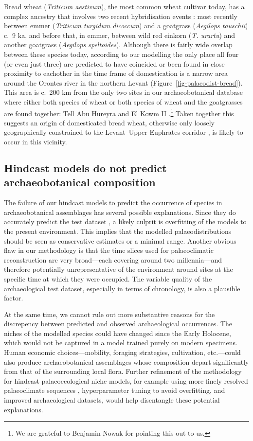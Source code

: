 \documentclass[
  authoryear,
  preprint]{elsarticle}
\begin{document}
Bread wheat (\emph{Triticum aestivum}), the most common wheat cultivar
today, has a complex ancestry that involves two recent hybridisation
events \citep{LevyFeldman2022}: most recently between emmer
(\emph{Triticum turgidum dicoccum}) and a goatgrass (\emph{Aegilops
tauschii}) c.~9 ka, and before that, in emmer, between wild red einkorn
(\emph{T. urartu}) and another goatgrass (\emph{Aegilops speltoides}).
Although there is fairly wide overlap between these species today,
according to our modelling the only place all four (or even just three)
are predicted to have coincided or been found in close proximity to
eachother in the time frame of domestication is a narrow area around the
Orontes river in the northern Levant
(Figure~\ref{fig-palaeodist-bread}). This area is c.~200 km from the
only two sites in our archaeobotanical database where either both
species of wheat or both species of wheat and the goatgrasses are found
together: Tell Abu Hureyra and El Kowm II
\citep{ArranzOtaeguiRoe2023}.\footnote{We are grateful to Benjamin Nowak
  for pointing this out to us.} Taken together this suggests an origin
of domesticated bread wheat, otherwise only loosely geographically
constrained to the Levant--Upper Euphrates corridor
\citep{LevyFeldman2022}, is likely to occur in this vicinity.

\subsection{Hindcast models do not predict archaeobotanical
composition}\label{sec-discuss-hindcasting}

The failure of our hindcast models to predict the occurrence of species
in archaeobotanical assemblages has several possible explanations. Since
they do accurately predict the test dataset , a likely culprit is
overfitting of the models to the present environment. This implies that
the modelled palaeodistributions should be seen as conservative
estimates or a minimal range. Another obvious flaw in our methodology is
that the time slices used for palaeoclimatic reconstruction are very
broad---each covering around two millennia---and therefore potentially
unrepresentative of the environment around sites at the specific time at
which they were occupied. The variable quality of the archaeological
test dataset, especially in terms of chronology, is also a plausible
factor.

At the same time, we cannot rule out more substantive reasons for the
discrepency between predicted and observed archaeological occurrences.
The niches of the modelled species could have changed since the Early
Holocene, which would not be captured in a model trained purely on
modern specimens. Human economic choices---mobility, foraging
strategies, cultivation, etc.---could also produce archaeobotanical
assemblages whose composition depart significantly from that of the
surrounding local flora. Further refinement of the methodology for
hindcast palaeoecological niche models, for example using more finely
resolved palaeoclimate sequences \citep[e.g.][]{KargerEtAl2023},
hyperparameter tuning to avoid overfitting, and improved archaeological
datasets, would help disentangle these potential explanations.
\end{document}
